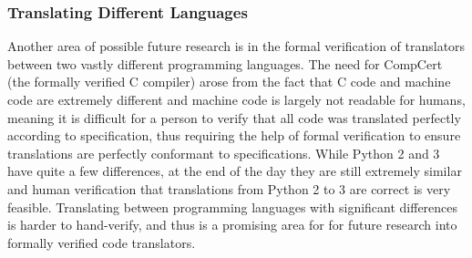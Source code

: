 \subsubsection{Translating Different Languages}
Another area of possible future research is in the formal verification of translators between two vastly different programming languages. The need for CompCert (the formally verified C compiler) arose from the fact that C code and machine code are extremely different and machine code is largely not readable for humans, meaning it is difficult for a person to verify that all code was translated perfectly according to specification, thus requiring the help of formal verification to ensure translations are perfectly conformant to specifications. While Python 2 and 3 have quite a few differences, at the end of the day they are still extremely similar and human verification that translations from Python 2 to 3 are correct is very feasible. Translating between programming languages with significant differences is harder to hand-verify, and thus is a promising area for for future research into formally verified code translators.